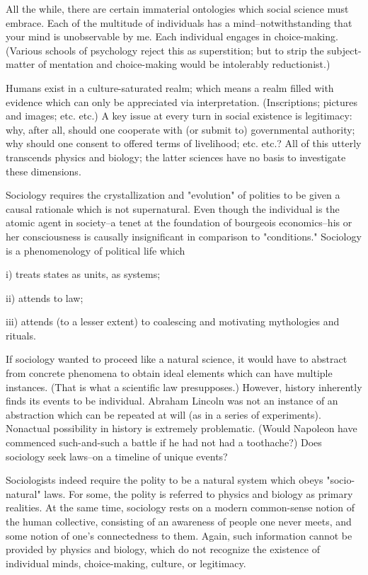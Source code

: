 \begin{enumerate}[label=\alph*.]
All the while, there are certain immaterial ontologies which social science must embrace. Each of the multitude of individuals has a mind–notwithstanding that your mind is unobservable by me. Each individual engages in choice-making. (Various schools of psychology reject this as superstition; but to strip the subject-matter of mentation and choice-making would be intolerably reductionist.)

Humans exist in a culture-saturated realm; which means a realm filled with evidence which can only be appreciated via interpretation. (Inscriptions; pictures and images; etc. etc.) A key issue at every turn in social existence is legitimacy: why, after all, should one cooperate with (or submit to) governmental authority; why should one consent to offered terms of livelihood; etc. etc.? All of this utterly transcends physics and biology; the latter sciences have no basis to investigate these dimensions.

Sociology requires the crystallization and "evolution" of polities to be given a causal rationale which is not supernatural. Even though the individual is the atomic agent in society–a tenet at the foundation of bourgeois economics–his or her consciousness is causally insignificant in comparison to "conditions." Sociology is a phenomenology of political life which

i) treats states as units, as systems;

ii) attends to law;

iii) attends (to a lesser extent) to coalescing and motivating mythologies and rituals.

If sociology wanted to proceed like a natural science, it would have to abstract from concrete phenomena to obtain ideal elements which can have multiple instances. (That is what a scientific law presupposes.) However, history inherently finds its events to be individual. Abraham Lincoln was not an instance of an abstraction which can be repeated at will (as in a series of experiments). Nonactual possibility in history is extremely problematic. (Would Napoleon have commenced such-and-such a battle if he had not had a toothache?) Does sociology seek laws–on a timeline of unique events?

Sociologists indeed require the polity to be a natural system which obeys "socio-natural" laws. For some, the polity is referred to physics and biology as primary realities. At the same time, sociology rests on a modern common-sense notion of the human collective, consisting of an awareness of people one never meets, and some notion of one’s connectedness to them. Again, such information cannot be provided by physics and biology, which do not recognize the existence of individual minds, choice-making, culture, or legitimacy.


\end{enumerate}
